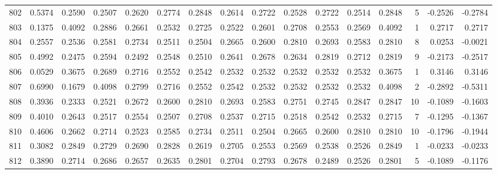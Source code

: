 \begin{tabular}{lrrrrrrrrrrrrrrr}
802 &      0.5374 &  0.2590 &  0.2507 &  0.2620 &  0.2774 &  0.2848 &  0.2614 &  0.2722 &  0.2528 &  0.2722 &   0.2514 &     0.2848 &      5 &                   -0.2526 &                    -0.2784 \\
803 &      0.1375 &  0.4092 &  0.2886 &  0.2661 &  0.2532 &  0.2725 &  0.2522 &  0.2601 &  0.2708 &  0.2553 &   0.2569 &     0.4092 &      1 &                    0.2717 &                     0.2717 \\
804 &      0.2557 &  0.2536 &  0.2581 &  0.2734 &  0.2511 &  0.2504 &  0.2665 &  0.2600 &  0.2810 &  0.2693 &   0.2583 &     0.2810 &      8 &                    0.0253 &                    -0.0021 \\
805 &      0.4992 &  0.2475 &  0.2594 &  0.2492 &  0.2548 &  0.2510 &  0.2641 &  0.2678 &  0.2634 &  0.2819 &   0.2712 &     0.2819 &      9 &                   -0.2173 &                    -0.2517 \\
806 &      0.0529 &  0.3675 &  0.2689 &  0.2716 &  0.2552 &  0.2542 &  0.2532 &  0.2532 &  0.2532 &  0.2532 &   0.2532 &     0.3675 &      1 &                    0.3146 &                     0.3146 \\
807 &      0.6990 &  0.1679 &  0.4098 &  0.2799 &  0.2716 &  0.2552 &  0.2542 &  0.2532 &  0.2532 &  0.2532 &   0.2532 &     0.4098 &      2 &                   -0.2892 &                    -0.5311 \\
808 &      0.3936 &  0.2333 &  0.2521 &  0.2672 &  0.2600 &  0.2810 &  0.2693 &  0.2583 &  0.2751 &  0.2745 &   0.2847 &     0.2847 &     10 &                   -0.1089 &                    -0.1603 \\
809 &      0.4010 &  0.2643 &  0.2517 &  0.2554 &  0.2507 &  0.2708 &  0.2537 &  0.2715 &  0.2518 &  0.2542 &   0.2532 &     0.2715 &      7 &                   -0.1295 &                    -0.1367 \\
810 &      0.4606 &  0.2662 &  0.2714 &  0.2523 &  0.2585 &  0.2734 &  0.2511 &  0.2504 &  0.2665 &  0.2600 &   0.2810 &     0.2810 &     10 &                   -0.1796 &                    -0.1944 \\
811 &      0.3082 &  0.2849 &  0.2729 &  0.2690 &  0.2828 &  0.2619 &  0.2705 &  0.2553 &  0.2569 &  0.2538 &   0.2526 &     0.2849 &      1 &                   -0.0233 &                    -0.0233 \\
812 &      0.3890 &  0.2714 &  0.2686 &  0.2657 &  0.2635 &  0.2801 &  0.2704 &  0.2793 &  0.2678 &  0.2489 &   0.2526 &     0.2801 &      5 &                   -0.1089 &                    -0.1176 \\

\end{tabular}
